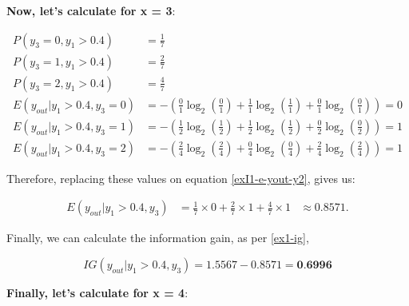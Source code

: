 \documentclass[12pt]{article}
\begin{document}
\begin{enumerate}[leftmargin=\labelsep]
    \textbf{Now, let's calculate for x = 3}:

    \[
        \begin{aligned}
            P(y_3 = 0, y_1 > 0.4)          & = \frac{1}{7}                                                                                       \\
            P(y_3 = 1, y_1 > 0.4)          & = \frac{2}{7}                                                                                       \\
            P(y_3 = 2, y_1 > 0.4)          & = \frac{4}{7}                                                                                       \\
            E(y_{out} | y_1 > 0.4 , y_3 = 0) & = - \left(\frac{0}{1} \log_2\left(\frac{0}{1}\right) + \frac{1}{1} \log_2\left(\frac{1}{1}\right)
                + \frac{0}{1} \log_2\left(\frac{0}{1}\right)\right) = 0                                                                          \\
            E(y_{out} | y_1 > 0.4 , y_3 = 1) & = - \left(\frac{1}{2} \log_2\left(\frac{1}{2}\right) + \frac{1}{2} \log_2\left(\frac{1}{2}\right)
                + \frac{0}{2} \log_2\left(\frac{0}{2}\right)\right) = 1                                                                          \\
            E(y_{out} | y_1 > 0.4 , y_3 = 2) & = - \left(\frac{2}{4} \log_2\left(\frac{2}{4}\right) + \frac{0}{4} \log_2\left(\frac{0}{4}\right)
                + \frac{2}{4} \log_2\left(\frac{2}{4}\right)\right) = 1
        \end{aligned}
    \]

    Therefore, replacing these values on equation \eqref{exI1-e-yout-y2}, gives us:

    \[
        \begin{aligned}
            E(y_{out} | y_1>0.4, y_3) & = \frac{1}{7} \times 0 + \frac{2}{7} \times 1 +  \frac{4}{7} \times 1 & \approx 0.8571.
        \end{aligned}
    \]

    Finally, we can calculate the information gain, as per \eqref{ex1-ig},

    \[
        IG(y_{out} | y_1 > 0.4, y_{3}) = 1.5567 - 0.8571 = \textbf{0.6996}
    \]

    \textbf{Finally, let's calculate for x = 4}:


\end{enumerate}
\end{document}
